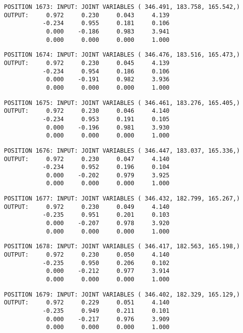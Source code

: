 \begin{verbatim}
POSITION 1673: INPUT: JOINT VARIABLES ( 346.491, 183.758, 165.542,)
OUTPUT:     0.972     0.230     0.043     4.139
           -0.234     0.955     0.181     0.106
            0.000    -0.186     0.983     3.941
            0.000     0.000     0.000     1.000
\end{verbatim} \pagebreak[1]\begin{verbatim}
POSITION 1674: INPUT: JOINT VARIABLES ( 346.476, 183.516, 165.473,)
OUTPUT:     0.972     0.230     0.045     4.139
           -0.234     0.954     0.186     0.106
            0.000    -0.191     0.982     3.936
            0.000     0.000     0.000     1.000
\end{verbatim} \pagebreak[1]\begin{verbatim}
POSITION 1675: INPUT: JOINT VARIABLES ( 346.461, 183.276, 165.405,)
OUTPUT:     0.972     0.230     0.046     4.140
           -0.234     0.953     0.191     0.105
            0.000    -0.196     0.981     3.930
            0.000     0.000     0.000     1.000
\end{verbatim} \pagebreak[1]\begin{verbatim}
POSITION 1676: INPUT: JOINT VARIABLES ( 346.447, 183.037, 165.336,)
OUTPUT:     0.972     0.230     0.047     4.140
           -0.234     0.952     0.196     0.104
            0.000    -0.202     0.979     3.925
            0.000     0.000     0.000     1.000
\end{verbatim} \pagebreak[1]\begin{verbatim}
POSITION 1677: INPUT: JOINT VARIABLES ( 346.432, 182.799, 165.267,)
OUTPUT:     0.972     0.230     0.049     4.140
           -0.235     0.951     0.201     0.103
            0.000    -0.207     0.978     3.920
            0.000     0.000     0.000     1.000
\end{verbatim} \pagebreak[1]\begin{verbatim}
POSITION 1678: INPUT: JOINT VARIABLES ( 346.417, 182.563, 165.198,)
OUTPUT:     0.972     0.230     0.050     4.140
           -0.235     0.950     0.206     0.102
            0.000    -0.212     0.977     3.914
            0.000     0.000     0.000     1.000
\end{verbatim} \pagebreak[1]\begin{verbatim}
POSITION 1679: INPUT: JOINT VARIABLES ( 346.402, 182.329, 165.129,)
OUTPUT:     0.972     0.229     0.051     4.140
           -0.235     0.949     0.211     0.101
            0.000    -0.217     0.976     3.909
            0.000     0.000     0.000     1.000
\end{verbatim} \pagebreak[1]\begin{verbatim}

\end{verbatim}
